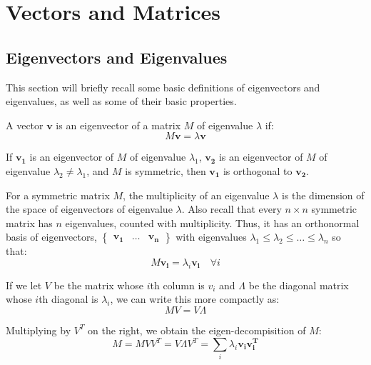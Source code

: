\section{Vectors and Matrices}
\label{sec:vectorsAndMatrices}

\subsection{Eigenvectors and Eigenvalues}
\label{sec:eigenvectorsAndEigenvalues}
This section will briefly recall some basic definitions of eigenvectors and
eigenvalues, as well as some of their basic properties.

A vector $\mathbf{v}$ is an eigenvector of a matrix $M$ of eigenvalue $\lambda$ 
if:
\begin{displaymath}
M\mathbf{v} = \lambda\textbf{v}
\end{displaymath}

If $\mathbf{v_{1}}$ is an eigenvector of $M$ of eigenvalue $\lambda_{1}$, 
$\mathbf{v_{2}}$ is an eigenvector of $M$ of eigenvalue $\lambda_{2} \neq 
\lambda_{1}$, and $M$ is symmetric, then $\mathbf{v_{1}}$ is orthogonal to 
$\mathbf{v_{2}}$.

For a symmetric matrix $M$, the multiplicity of an eigenvalue $\lambda$ is the
dimension of the space of eigenvectors of eigenvalue $\lambda$. Also recall that
every $n{\times}n$ symmetric matrix has $n$ eigenvalues, counted with 
multiplicity. Thus, it has an orthonormal basis of eigenvectors, 
$\begin{Bmatrix} \mathbf{v_{1}} & \ldots & \mathbf{v_{n}} \end{Bmatrix}$ with
eigenvalues $\lambda_{1} \leq \lambda_{2} \leq \ldots \leq \lambda_{n}$ so that:
\begin{displaymath}
M\mathbf{v_{i}} = \lambda_{i}\mathbf{v_{i}} \quad \forall i
\end{displaymath}

If we let $V$ be the matrix whose $i$th column is $v_{i}$ and $\Lambda$ be the 
diagonal matrix whose $i$th diagonal is $\lambda_{i}$, we can write this more 
compactly as:
\begin{displaymath}
MV = V\Lambda
\end{displaymath}

Multiplying by $V^{T}$ on the right, we obtain the eigen-decompisition of $M$:
\begin{displaymath}
M = MVV^{T} = V{\Lambda}V^{T} = \sum_{i} \lambda_{i}\mathbf{v_{i}}\mathbf{v_{i}^{T}}
\end{displaymath}

